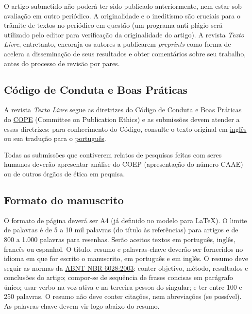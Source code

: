 \documentclass{textolivre}
\begin{document}
O artigo submetido não poderá ter sido publicado anteriormente, nem estar sob avaliação em outro periódico. 
A originalidade e o ineditismo são cruciais para o trâmite de textos no periódico 
em questão (um programa anti-plágio será utilizado pelo editor para verificação da originalidade do artigo). 
A revista \emph{Texto Livre}, entretanto, encoraja os autores a publicarem \emph{preprints}
como forma de acelera a disseminação de seus resultados e obter comentários sobre seu trabalho,
antes do processo de revisão por pares.


\subsection{Código de Conduta e Boas Práticas}\label{sec-conduta}
A revista \emph{Texto Livre} segue as diretrizes do Código de Conduta e Boas Práticas do 
\href{http://publicationethics.org/}{COPE} (Committee on Publication Ethics) 
e as submissões devem atender a essas diretrizes: para conhecimento do Código, 
consulte o texto original em \href{http://publicationethics.org/files/Code_of_conduct_for_journal_editors_1.pdf}{inglês} 
ou sua tradução para o \href{http://www.periodicos.letras.ufmg.br/CCBP-COPE.pdf}{português}.

Todas as submissões que contiverem relatos de pesquisas feitas com seres humanos deverão apresentar análise do COEP (apresentação do número CAAE) ou de outros órgãos de ética em pequisa.


\subsection{Formato do manuscrito}\label{sec-fmt-manuscrito}
O formato de página deverá ser A4 (já definido no modelo para \LaTeX{}). O limite de palavras é de 5 a 10 mil palavras (do título às referências) 
para artigos e de 800 a 1.000 palavras para resenhas. 
Serão aceitos textos em português, inglês, francês ou espanhol. 
O título, resumo e palavras-chave deverão ser fornecidos no idioma em que for escrito o manuscrito, em português e em inglês.
O resumo deve seguir as normas da \href{https://www.abntcatalogo.com.br/norma.aspx?ID=2003}{ABNT NBR 6028:2003}: conter objetivo, método, resultados e conclusões do artigo; 
compor-se de sequência de frases concisas em parágrafo único;  usar verbo na voz ativa e na terceira pessoa do singular; 
e ter entre 100 e 250 palavras. O resumo não deve conter citações, nem abreviações (se possível).
As palavras-chave devem vir logo abaixo do resumo.
\end{document}
